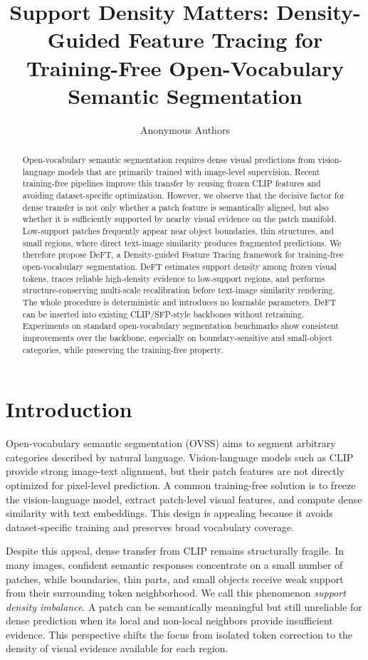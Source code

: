 \documentclass[letterpaper]{article}
\title{Support Density Matters: Density-Guided Feature Tracing for Training-Free Open-Vocabulary Semantic Segmentation}
\author{
Anonymous Authors
}
\begin{document}
\maketitle

\begin{abstract}
Open-vocabulary semantic segmentation requires dense visual predictions from
vision-language models that are primarily trained with image-level supervision.
Recent training-free pipelines improve this transfer by reusing frozen CLIP
features and avoiding dataset-specific optimization. However, we observe that
the decisive factor for dense transfer is not only whether a patch feature is
semantically aligned, but also whether it is sufficiently supported by nearby
visual evidence on the patch manifold. Low-support patches frequently appear
near object boundaries, thin structures, and small regions, where direct
text-image similarity produces fragmented predictions. We therefore propose
DeFT, a Density-guided Feature Tracing framework for training-free
open-vocabulary segmentation. DeFT estimates support density among frozen visual
tokens, traces reliable high-density evidence to low-support regions, and
performs structure-conserving multi-scale recalibration before text-image
similarity rendering. The whole procedure is deterministic and introduces no
learnable parameters. DeFT can be inserted into existing CLIP/SFP-style
backbones without retraining. Experiments on standard open-vocabulary
segmentation benchmarks show consistent improvements over the backbone,
especially on boundary-sensitive and small-object categories, while preserving
the training-free property.
\end{abstract}

\section{Introduction}

Open-vocabulary semantic segmentation (OVSS) aims to segment arbitrary
categories described by natural language. Vision-language models such as CLIP
provide strong image-text alignment, but their patch features are not directly
optimized for pixel-level prediction. A common training-free solution is to
freeze the vision-language model, extract patch-level visual features, and
compute dense similarity with text embeddings. This design is appealing because
it avoids dataset-specific training and preserves broad vocabulary coverage.

Despite this appeal, dense transfer from CLIP remains structurally fragile. In
many images, confident semantic responses concentrate on a small number of
patches, while boundaries, thin parts, and small objects receive weak support
from their surrounding token neighborhood. We call this phenomenon \emph{support
density imbalance}. A patch can be semantically meaningful but still unreliable
for dense prediction when its local and non-local neighbors provide insufficient
evidence. This perspective shifts the focus from isolated token correction to
the density of visual evidence available for each region.
\end{document}
